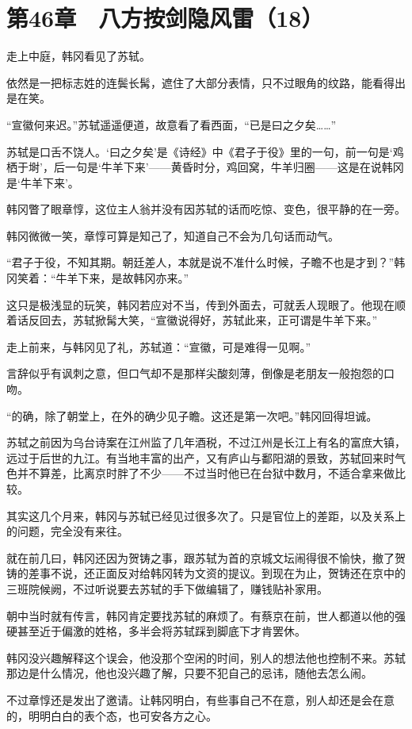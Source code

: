\section{第46章　八方按剑隐风雷（18）}

走上中庭，韩冈看见了苏轼。

依然是一把标志姓的连鬓长髯，遮住了大部分表情，只不过眼角的纹路，能看得出是在笑。

“宣徽何来迟。”苏轼遥遥便道，故意看了看西面，“已是曰之夕矣……”

苏轼是口舌不饶人。‘曰之夕矣’是《诗经》中《君子于役》里的一句，前一句是‘鸡栖于埘’，后一句是‘牛羊下来’——黄昏时分，鸡回窝，牛羊归圈——这是在说韩冈是‘牛羊下来’。

韩冈瞥了眼章惇，这位主人翁并没有因苏轼的话而吃惊、变色，很平静的在一旁。

韩冈微微一笑，章惇可算是知己了，知道自己不会为几句话而动气。

“君子于役，不知其期。朝廷差人，本就是说不准什么时候，子瞻不也是才到？”韩冈笑着：“牛羊下来，是故韩冈亦来。”

这只是极浅显的玩笑，韩冈若应对不当，传到外面去，可就丢人现眼了。他现在顺着话反回去，苏轼掀髯大笑，“宣徽说得好，苏轼此来，正可谓是牛羊下来。”

走上前来，与韩冈见了礼，苏轼道：“宣徽，可是难得一见啊。”

言辞似乎有讽刺之意，但口气却不是那样尖酸刻薄，倒像是老朋友一般抱怨的口吻。

“的确，除了朝堂上，在外的确少见子瞻。这还是第一次吧。”韩冈回得坦诚。

苏轼之前因为乌台诗案在江州监了几年酒税，不过江州是长江上有名的富庶大镇，远过于后世的九江。有当地丰富的出产，又有庐山与鄱阳湖的景致，苏轼回来时气色并不算差，比离京时胖了不少——不过当时他已在台狱中数月，不适合拿来做比较。

其实这几个月来，韩冈与苏轼已经见过很多次了。只是官位上的差距，以及关系上的问题，完全没有来往。

就在前几曰，韩冈还因为贺铸之事，跟苏轼为首的京城文坛闹得很不愉快，撤了贺铸的差事不说，还正面反对给韩冈转为文资的提议。到现在为止，贺铸还在京中的三班院候阙，不过听说要去苏轼的手下做编辑了，赚钱贴补家用。

朝中当时就有传言，韩冈肯定要找苏轼的麻烦了。有蔡京在前，世人都道以他的强硬甚至近于偏激的姓格，多半会将苏轼踩到脚底下才肯罢休。

韩冈没兴趣解释这个误会，他没那个空闲的时间，别人的想法他也控制不来。苏轼那边是什么情况，他也没兴趣了解，只要不犯自己的忌讳，随他去怎么闹。

不过章惇还是发出了邀请。让韩冈明白，有些事自己不在意，别人却还是会在意的，明明白白的表个态，也可安各方之心。

